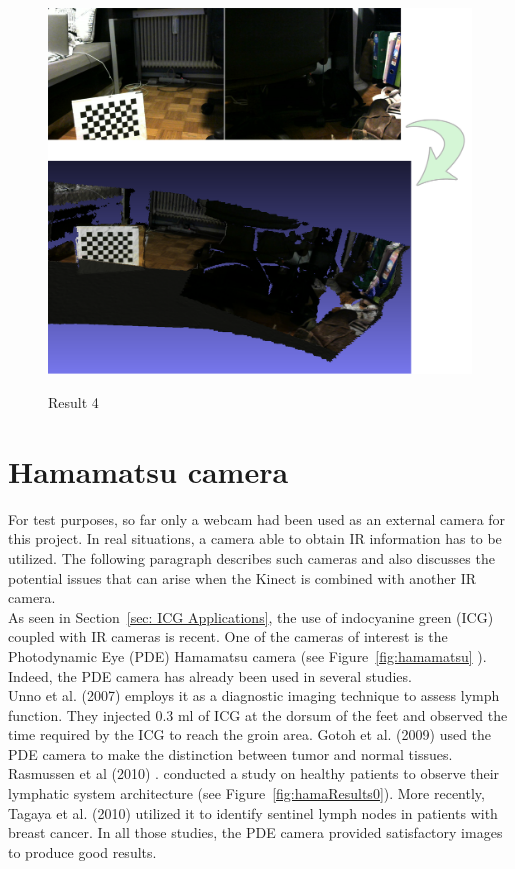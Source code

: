 \begin{figure}
\caption{Result 4}
\centering
    \includegraphics[width=1.0\textwidth]{images/result4.png}
\label{fig:result4}
\end{figure}

\section{Hamamatsu camera}
\label{sec:Hamamatsu camera}

For test purposes, so far only a webcam had been used as an external camera for this project. In real situations, a camera able to obtain IR information has to be utilized. The following paragraph describes such cameras and also discusses the potential issues that can arise when the Kinect is combined with another IR camera.\\

As seen in Section~\ref{sec: ICG Applications}, the use of indocyanine green (ICG) coupled with IR cameras is recent. One of the cameras of interest is the Photodynamic Eye (PDE) Hamamatsu camera (see Figure~\ref{fig:hamamatsu} \cite{pde}). Indeed, the PDE camera has already been used in several studies. \\

Unno et al. (2007) \cite{unno_quantitative_2008} employs it as a diagnostic imaging technique to assess lymph function. They injected 0.3 ml of ICG at the dorsum of the feet and observed the time required by the ICG to reach the groin area. Gotoh et al. (2009) \cite{gotoh_novel_2009} used the PDE camera to make the distinction between tumor and normal tissues. Rasmussen et al (2010) \cite{rasmussen_lymphatic_2009}. conducted a study on healthy patients to observe their lymphatic system architecture (see Figure~\ref{fig:hamaResults0}). More recently, Tagaya et al. (2010) \cite{tagaya_non-invasive_2010} utilized it to identify sentinel lymph nodes in patients with breast cancer. In all those studies, the PDE camera provided satisfactory images to produce good results.\\

